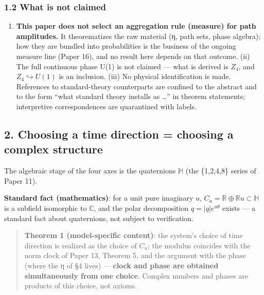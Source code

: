 \documentclass[
]{ltjsarticle}
\providecommand{\tightlist}{%
  \setlength{\itemsep}{0pt}\setlength{\parskip}{0pt}}
\begin{document}
\subsubsection{1.2 What is not claimed}\label{what-is-not-claimed}

\begin{enumerate}
\def\labelenumi{(\roman{enumi})}
\tightlist
\item
  \textbf{This paper does not select an aggregation rule (measure) for
  path amplitudes.} It theorematizes the raw material (η, path sets,
  phase algebra); how they are bundled into probabilities is the
  business of the ongoing measure line (Paper 16), and no result here
  depends on that outcome. (ii) The full continuous phase U(1) is not
  claimed --- what is derived is \(Z_4\), and
  \(Z_4\hookrightarrow U(1)\) is an inclusion. (iii) No physical
  identification is made. References to standard-theory counterparts are
  confined to the abstract and to the form ``what standard theory
  installs as \ldots{}'' in theorem statements; interpretive
  correspondences are quarantined with labels.
\end{enumerate}

\subsection{2. Choosing a time direction = choosing a complex
structure}\label{choosing-a-time-direction-choosing-a-complex-structure}

The algebraic stage of the four axes is the quaternions \(\mathbb{H}\)
(the \{1,2,4,8\} series of Paper 11).

\textbf{Standard fact (mathematics)}: for a unit pure imaginary \(u\),
\(C_u=\mathbb{R}\oplus\mathbb{R}u\subset\mathbb{H}\) is a subfield
isomorphic to \(\mathbb{C}\), and the polar decomposition
\(q=|q|e^{u\theta}\) exists --- a standard fact about quaternions, not
subject to verification.

\begin{quote}
\textbf{Theorem 1 (model-specific content)}: the system's choice of time
direction is realized as the choice of \(C_u\); the modulus coincides
with the norm clock of Paper 13, Theorem 5, and the argument with the
phase (where the η of §4 lives) --- \textbf{clock and phase are obtained
simultaneously from one choice}. Complex numbers and phases are products
of this choice, not axioms.
\end{quote}
\end{document}

